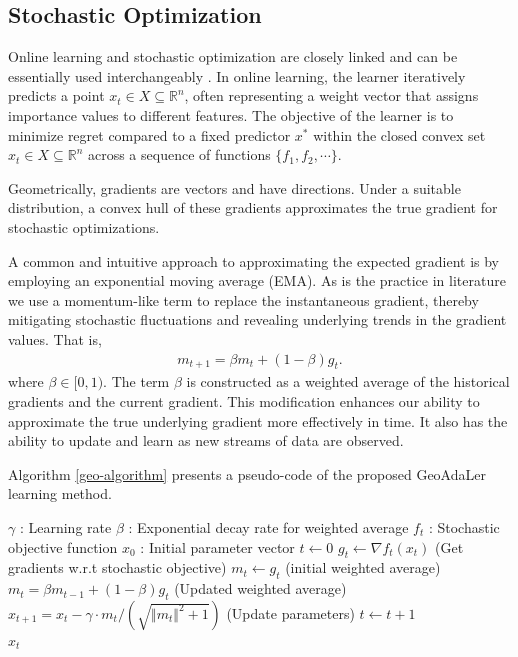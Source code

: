 \documentclass{article}
\begin{document}
\subsection{Stochastic Optimization}
Online learning and stochastic optimization are closely linked and can be essentially used interchangeably \citep{duchi2011adaptive, cesa2004generalization}. 
In online learning, the learner iteratively predicts a point $x_t \in X \subseteq \mathbb{R}^n$, often representing a weight vector that assigns importance values to different features. The objective of the learner is to minimize regret compared to a fixed predictor $x^*$ within the closed convex set $x_t \in X \subseteq \mathbb{R}^n$ across a sequence of functions $\{f_1, f_2,  \cdots   \}$.

\noindent
Geometrically, gradients are vectors and have directions. Under a suitable distribution, a convex hull of these gradients approximates the true gradient for stochastic optimizations.

A common and intuitive approach to approximating the expected gradient is by employing an exponential moving average (EMA). As is the practice in literature \citep{hinton2012neural, kingma2014adam}  we use a momentum-like term to replace the instantaneous gradient, thereby mitigating stochastic fluctuations and revealing underlying trends in the gradient values. That is,
\begin{align}
    m_{t+1}= \beta m_{t}+ (1-\beta) g_t.
\end{align}
where $\beta \in [0, 1)$.
The term $\beta$ is constructed as a weighted average of the historical gradients and the current gradient. This modification enhances our ability to approximate the true underlying gradient more effectively in time.
It also has the ability to update and learn as new streams of data are observed.

\noindent
Algorithm \ref{geo-algorithm} presents a pseudo-code of the proposed GeoAdaLer learning method. 

\begin{algorithm} 
\caption{GeoAdaLer}\label{geo-algorithm}
\begin{algorithmic}
\Require $\gamma$ : Learning rate
\Require $\beta$ : Exponential decay rate for weighted average
\Require $f_t$ : Stochastic objective function
\Require $x_0$ : Initial parameter vector
\State $t \gets 0$
\State $g_t \gets \nabla f_t(x_t)$ (Get gradients w.r.t stochastic objective)
\State $m_t \gets g_t$ (initial weighted average)
\Else
\State $m_t=\beta m_{t-1} +(1-\beta)g_t$ (Updated weighted average)
\EndIf
\State$x_{t+1}=x_t-\gamma \cdot m_{t}/(\sqrt{\Vert m_{t}\Vert^2+1})$ (Update parameters)
\State $t \gets t+1$
\EndWhile\\
\Return $x_t$ 
\end{algorithmic}
\end{algorithm}
\end{document}
